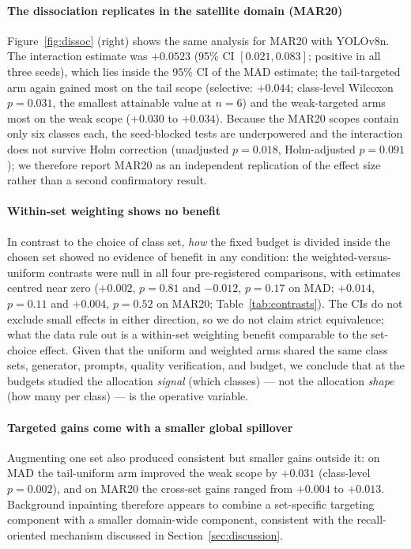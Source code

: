 \documentclass[preprint,12pt,authoryear]{elsarticle}
\begin{document}
\paragraph{The dissociation replicates in the satellite domain (MAR20)}
Figure~\ref{fig:dissoc} (right) shows the same analysis for MAR20 with
YOLOv8n. The interaction estimate was $+0.0523$ (95\% CI
$[0.021, 0.083]$; positive in all three seeds), which lies inside the
95\% CI of the MAD estimate; the tail-targeted arm again gained most on
the tail scope (selective: $+0.044$; class-level Wilcoxon $p = 0.031$,
the smallest attainable value at $n = 6$) and the weak-targeted arms
most on the weak scope ($+0.030$ to $+0.034$). Because the MAR20 scopes
contain only six classes each, the seed-blocked tests are underpowered
and the interaction does not survive Holm correction (unadjusted
$p = 0.018$, Holm-adjusted $p = 0.091$); we therefore report MAR20 as an
independent replication of the effect size rather than a second
confirmatory result.

\paragraph{Within-set weighting shows no benefit}
In contrast to the choice of class set, \emph{how} the fixed budget is
divided inside the chosen set showed no evidence of benefit in any
condition: the weighted-versus-uniform contrasts were null in all four
pre-registered comparisons, with estimates centred near zero ($+0.002$,
$p = 0.81$ and $-0.012$, $p = 0.17$ on MAD; $+0.014$, $p = 0.11$ and
$+0.004$, $p = 0.52$ on MAR20; Table~\ref{tab:contrasts}). The CIs do
not exclude small effects in either direction, so we do not claim strict
equivalence; what the data rule out is a within-set weighting benefit
comparable to the set-choice effect. Given that the uniform and weighted
arms shared the same class sets, generator, prompts, quality
verification, and budget, we conclude that at the budgets studied the
allocation \emph{signal} (which classes) --- not the allocation
\emph{shape} (how many per class) --- is the operative variable.

\paragraph{Targeted gains come with a smaller global spillover}
Augmenting one set also produced consistent but smaller gains outside
it: on MAD the tail-uniform arm improved the weak scope by $+0.031$
(class-level $p = 0.002$), and on MAR20 the cross-set gains ranged from
$+0.004$ to $+0.013$. Background inpainting therefore appears to combine
a set-specific targeting component with a smaller domain-wide component,
consistent with the recall-oriented mechanism discussed in
Section~\ref{sec:discussion}.
\end{document}
